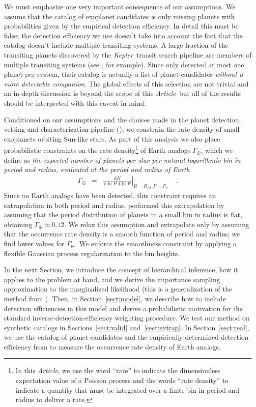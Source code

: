 \documentclass[12pt,preprint]{aastex}
\newcommand{\project}[1]{\emph{#1}}
\newcommand{\kepler}{\project{Kepler}}
\newcommand{\paper}{\textsl{Article}}
\newcommand{\Sect}[1]{Section~\ref{sect:#1}}
\newcommand{\sect}[1]{\Sect{#1}}
\newcommand{\sectalt}[1]{\ref{sect:#1}}
\newcommand{\dd}{\ensuremath{\,\mathrm{d}}}
\newcommand{\rate}{\ensuremath{\Gamma}}
\newcommand{\radius}{\ensuremath{R}}
\newcommand{\period}{\ensuremath{P}}
\newcommand{\gammaearth}{{\ensuremath{\rate_\oplus}}}
\begin{document}
We must emphasize one very important consequence of our assumptions.
We assume that the catalog of exoplanet candidates is only missing planets
with probabilities given by the empirical detection efficiency.
In detail this must be false; the detection efficiency we use
doesn't take into account the fact that the catalog doesn't include multiple
transiting systems.
A large fraction of the transiting planets discovered by the \kepler\ transit
search pipeline are members of multiple transiting systems (see
\citealt{lissauer}, for example).
Since \citet{petigura} only detected at most one planet per system, their
catalog is actually a list of planet candidates \emph{without a more
detectable companion}.
The global effects of this selection are not trivial and an in-depth
discussion is beyond the scope of this \paper\ but all of the results should
be interpreted with this caveat in mind.

Conditioned on our assumptions and the choices made in the planet detection,
vetting and characterization pipeline (\citealt{petigura-a, petigura}), we
constrain the rate density of small exoplanets orbiting Sun-like stars.
As part of this analysis we also place probabilistic constraints on the rate
density\footnote{In this \paper, we use the word ``rate'' to indicate the
dimensionless expectation value of a Poisson process and the words ``rate
density'' to indicate a quantity that must be integrated over a finite bin in
period and radius to deliver a rate.} of Earth analogs \gammaearth, which we
define as \emph{the expected number of planets per star per natural
logarithmic bin in period and radius, evaluated at the period and radius of
Earth}
\begin{eqnarray}
\gammaearth &=&
\left.\frac{\dd N}{\dd\ln\period\,\dd\ln\radius}\right|
_{\radius=\radius_\oplus,\,\period=\period_\oplus}\quad.
\end{eqnarray}
Since no Earth analogs have been detected, this constraint requires an
extrapolation in both period and radius.
\citet{petigura} performed this extrapolation by assuming that the period
distribution of planets in a small bin in radius is flat, obtaining
$\gammaearth \approx 0.12$.
We relax this assumption and extrapolate only by assuming that the occurrence
rate density is a smooth function of period and radius; we find lower values
for \gammaearth.
We enforce the smoothness constraint by applying a flexible Gaussian process
regularization to the bin heights.

In the next Section, we introduce the concept of hierarchical inference, how
it applies to the problem at hand, and we derive the importance sampling
approximation to the marginalized likelihood (this is a generalization of the
method from \citealt{hogge}).
Then, in \sect{model}, we describe how to include detection efficiencies in
this model and derive a probabilistic motivation for the standard
inverse-detection-efficiency weighting procedure.
We test our method on synthetic catalogs in Sections~\sectalt{valid}
and~\sectalt{extrap}.
In \sect{real}, we use the catalog of planet candidates and the empirically
determined detection efficiency from \citet{petigura} to measure the
occurrence rate density of Earth analogs.
\end{document}
